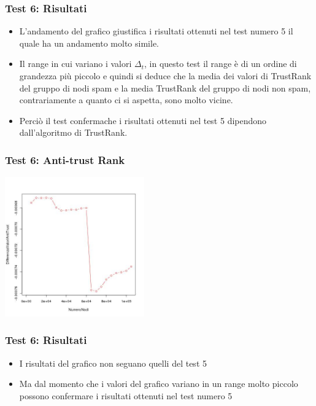 \documentclass{beamer}
\begin{document}
\begin{frame}
\frametitle{Test 6: Risultati}
\begin{itemize}
 \item L'andamento del grafico giustifica i risultati ottenuti nel test numero 5  il quale ha un andamento molto simile.
 \item Il range in cui variano i valori \(\Delta_t\), in questo test il range è di un ordine di grandezza più piccolo e quindi si deduce che la media dei valori di TrustRank del gruppo di nodi spam e la media TrustRank del gruppo di nodi non spam, contrariamente a quanto ci si aspetta, sono molto vicine. 
 \item Perciò il test confermache i risultati ottenuti nel test 5 dipendono dall'algoritmo di TrustRank.
 \end{itemize}
\end{frame}
\begin{frame}
\frametitle{Test 6: Anti-trust Rank}
\begin{center}
 \includegraphics[height=6cm]{immagini/test6/averageCompleteTest_antitrust_62}
\end{center}
\end{frame}
\begin{frame}
\frametitle{Test 6: Risultati}
\begin{itemize}
 \item I risultati del grafico non seguano quelli del test 5
 \item Ma dal momento che i  valori del grafico variano in un range molto piccolo possono confermare i risultati ottenuti nel test numero 5
 \end{itemize}
\end{frame}
\end{document}
